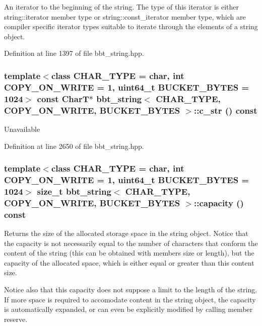 An iterator to the beginning of the string. The type of this iterator is either string::iterator member type or string::const\_\-iterator member type, which are compiler specific iterator types suitable to iterate through the elements of a string object. 

Definition at line 1397 of file bbt\_\-string.hpp.\hypertarget{classbbt__string_c153fa7ac5477ba7ef44c684cb396c0b}{
\subsubsection[{c\_\-str}]{\setlength{\rightskip}{0pt plus 5cm}template$<$class CHAR\_\-TYPE  = char, int COPY\_\-ON\_\-WRITE = 1, uint64\_\-t BUCKET\_\-BYTES = 1024$>$ const CharT$\ast$ {\bf bbt\_\-string}$<$ CHAR\_\-TYPE, COPY\_\-ON\_\-WRITE, BUCKET\_\-BYTES $>$::c\_\-str () const}}
\label{classbbt__string_c153fa7ac5477ba7ef44c684cb396c0b}


Unavailable 

Definition at line 2650 of file bbt\_\-string.hpp.\hypertarget{classbbt__string_43171d8b0097837372a408ec693559e6}{
\subsubsection[{capacity}]{\setlength{\rightskip}{0pt plus 5cm}template$<$class CHAR\_\-TYPE  = char, int COPY\_\-ON\_\-WRITE = 1, uint64\_\-t BUCKET\_\-BYTES = 1024$>$ size\_\-t {\bf bbt\_\-string}$<$ CHAR\_\-TYPE, COPY\_\-ON\_\-WRITE, BUCKET\_\-BYTES $>$::capacity () const}}
\label{classbbt__string_43171d8b0097837372a408ec693559e6}


Returns the size of the allocated storage space in the string object. Notice that the capacity is not necessarily equal to the number of characters that conform the content of the string (this can be obtained with members size or length), but the capacity of the allocated space, which is either equal or greater than this content size.

Notice also that this capacity does not suppose a limit to the length of the string. If more space is required to accomodate content in the string object, the capacity is automatically expanded, or can even be explicitly modified by calling member reserve.

